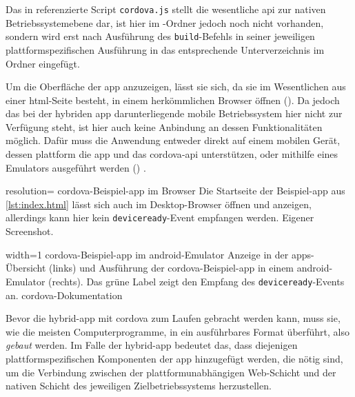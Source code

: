 {Das in  referenzierte Script \lstinline|cordova.js| stellt die \og wesentliche \gls{api} zur nativen Betriebssystemebene dar, ist hier im -Ordner jedoch noch nicht vorhanden, sondern wird erst nach Ausführung des \lstinline|build|-Befehls in seiner jeweiligen plattformspezifischen Ausführung in das entsprechende Unterverzeichnis im Ordner  eingefügt. 



Um die Oberfläche der \gls{app} anzuzeigen, lässt sie sich, da sie im Wesentlichen aus einer \gls{html}-Seite besteht, in einem herkömmlichen Browser öffnen ().
Da jedoch das bei der hybriden \gls{app} darunterliegende mobile Betriebssystem hier nicht zur Verfügung steht, ist hier auch keine Anbindung an dessen Funktionalitäten möglich.
Dafür muss die Anwendung entweder direkt auf einem mobilen Gerät, dessen \gls{plattform} die \gls{app} und das \gls{cordova}-\gls{api} unterstützen, oder mithilfe eines Emulators ausgeführt werden () \cite{Cordova-Docs_CLI}.

	{resolution=\screenshotRes}
	{\gls{cordova}-Beispiel-\gls{app} im Browser}
		{Die Startseite der Beispiel-\gls{app} aus \autoref{lst:index.html} lässt sich auch im Desktop-Browser öffnen und anzeigen, allerdings kann hier kein \lstinline|deviceready|-Event empfangen werden.}
	{Eigener Screenshot.}

	{width=1\textwidth}
	{\gls{cordova}-Beispiel-\gls{app} im \gls{android}-Emulator}
		{Anzeige in der \glspl{app}-Übersicht (links) und Ausführung der \gls{cordova}-Beispiel-\gls{app} in einem \gls{android}-Emulator (rechts). Das grüne Label zeigt den Empfang des \lstinline|deviceready|-Events an.}
	{\gls{cordova}-Dokumentation \cite{android_emulate_install.png}}

Bevor die \gls{hybrid-app} mit \gls{cordova} zum Laufen gebracht werden kann, muss sie, wie die meisten Computerprogramme, in ein ausführbares Format überführt, also \emph{gebaut} werden.
Im Falle der \gls{hybrid-app} bedeutet das, dass diejenigen plattformspezifischen Komponenten der \gls{app} hinzugefügt werden, die nötig sind, um die Verbindung zwischen der plattformunabhängigen Web-Schicht und der nativen Schicht des jeweiligen Zielbetriebssystems herzustellen.

}
